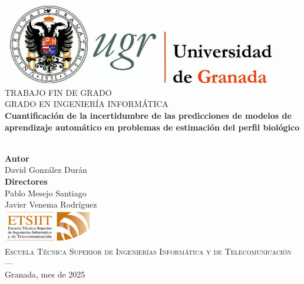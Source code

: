 \begin{titlepage}
\thispagestyle{empty}

\begin{center}
\includegraphics[width=0.9\textwidth]{portada/imagenes/logo_ugr.jpg}\\[1.4cm]

\textsc{ \Large TRABAJO FIN DE GRADO\\[0.2cm]}
\textsc{ GRADO EN INGENIERÍA INFORMÁTICA}\\[1cm]

{\LARGE \bfseries Cuantificación de la incertidumbre de las predicciones de modelos de aprendizaje automático en problemas de estimación del perfil biológico\\}
\noindent\\[3.5ex]
\end{center}

\vspace{1.5cm}

\begin{center}
\textbf{Autor}\\ {David González Durán}\\[2.5ex]
\textbf{Directores}\\
{Pablo Mesejo Santiago\\
Javier Venema Rodríguez}\\[2cm]
\includegraphics[width=0.3\textwidth]{portada/imagenes/etsiit_logo.png}\\[0.1cm]
\textsc{Escuela Técnica Superior de Ingenierías Informática y de Telecomunicación}\\
\textsc{---}\\
Granada, mes de 2025
\end{center}

\end{titlepage}

